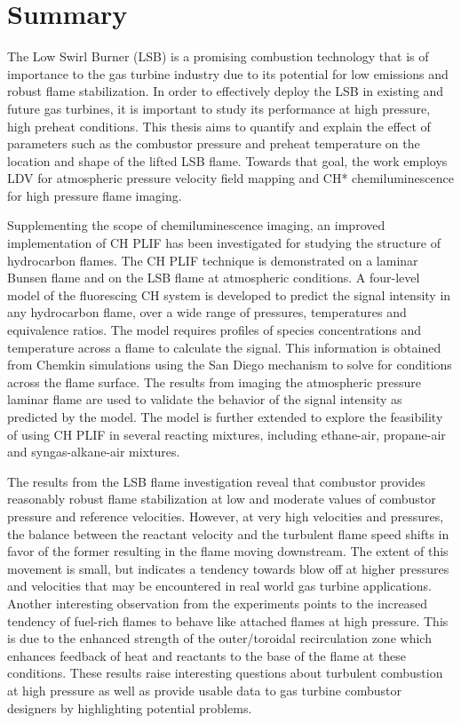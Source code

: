 \chapter*{Summary}

The Low Swirl Burner (LSB) is a promising combustion technology that is of importance to the gas turbine industry due to its potential for low  emissions and robust flame stabilization.
In order to effectively deploy the LSB in existing and future gas turbines, it is important to study its performance at high pressure, high preheat conditions.
This thesis aims to quantify and explain the effect of parameters such as the combustor pressure and preheat temperature on the location and shape of the lifted LSB flame.
Towards that goal, the work employs LDV for atmospheric pressure velocity field mapping and CH* chemiluminescence for high pressure flame imaging.

Supplementing the scope of chemiluminescence imaging, an improved implementation of CH PLIF has been investigated for studying the structure of hydrocarbon flames.
The CH PLIF technique is demonstrated on a laminar Bunsen flame and on the LSB flame at atmospheric conditions.
A four-level model of the fluorescing CH system is developed to predict the signal intensity in any hydrocarbon flame, over a wide range of pressures, temperatures and equivalence ratios.
The model requires profiles of species concentrations and temperature across a flame to calculate the signal.
This information is obtained from Chemkin simulations using the San Diego mechanism to solve for conditions across the flame surface.
The results from imaging the atmospheric pressure laminar flame are used to validate the behavior of the signal intensity as predicted by the model.
The model is further extended to explore the feasibility of using CH PLIF in several reacting mixtures, including ethane-air, propane-air and syngas-alkane-air mixtures.

The results from the LSB flame investigation reveal that combustor provides reasonably robust flame stabilization at low and moderate values of combustor pressure and reference velocities.
However, at very high velocities and pressures, the balance between the reactant velocity and the turbulent flame speed shifts in favor of the former resulting in the flame moving downstream.
The extent of this movement is small, but indicates a tendency towards blow off at higher pressures and velocities that may be encountered in real world gas turbine applications.
Another interesting observation from the experiments points to the increased tendency of fuel-rich flames to behave like attached flames at high pressure.
This is due to the enhanced strength of the outer/toroidal recirculation zone which enhances feedback of heat and reactants to the base of the flame at these conditions.
These results raise interesting questions about turbulent combustion at high pressure as well as provide usable data to gas turbine combustor designers by highlighting potential problems.

